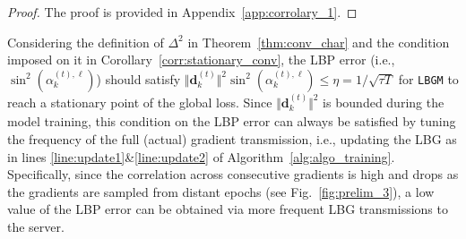 \documentclass{article}
\renewcommand{\vec}[3]{\boldsymbol{#1}_{#2}^{#3}}
\newcommand{\subsup}[3]{#1_{#2}^{#3}}
\newcommand{\innorm}[2]{\Vert #1\Vert_{#2}}
\newcommand{\algName}{{\tt LBGM}}
\begin{document}
\vspace{-3mm}
\begin{proof} The proof is provided in Appendix~\ref{app:corrolary_1}.
\end{proof}
\vspace{-0.1in}

Considering the definition of $\Delta^2$ in Theorem~\ref{thm:conv_char} and the condition imposed on it in Corollary~\ref{corr:stationary_conv}, the LBP error (i.e., $\sin^2(\subsup{\alpha}{k}{(t), \ell})$) should satisfy $\innorm{\vec{d}{k}{(t)}}{}^2 \sin^2(\subsup{\alpha}{k}{(t), \ell}) \leq \eta=1/\sqrt{\tau T}$ for {\algName} to reach a stationary point of the global loss. Since $\innorm{\vec{d}{k}{(t)}}{}^2 $ is bounded during the model training, this condition on the LBP error can always be satisfied by tuning the frequency of the full (actual) gradient transmission, i.e., updating the LBG as in lines \ref{line:update1}\&\ref{line:update2} of Algorithm~\ref{alg:algo_training}.
Specifically, since the correlation across consecutive gradients is high and drops as the gradients are sampled from distant epochs (see Fig.~\ref{fig:prelim_3}), a low value of the LBP error can be obtained via more frequent LBG transmissions to the server.
\end{document}
